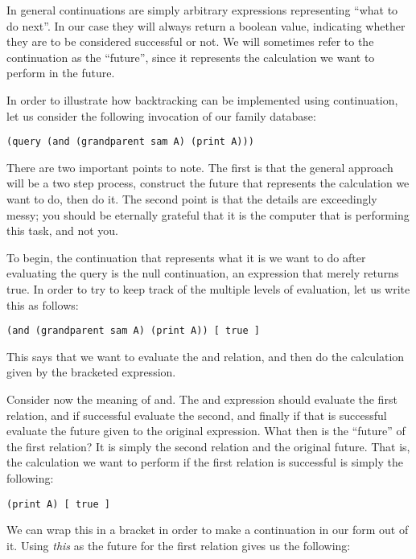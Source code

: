 In general continuations are simply arbitrary expressions representing ``what to
do next''.  In our case they will always return a boolean value, indicating
whether they are to be considered successful or not.  We will sometimes refer to
the continuation as the ``future'', since it represents the calculation we want
to perform in the future.

In order to illustrate how backtracking can be implemented using continuation,
let us consider the following invocation of our family database:

\begin{lstlisting}
(query (and (grandparent sam A) (print A)))
\end{lstlisting}

There are two important points to note.  The first is that the general approach
will be a two step process, construct the future that represents the calculation
we want to do, then do it.  The second point is that the details are exceedingly
messy; you should be eternally grateful that it is the computer that is
performing this task, and not you.

To begin, the continuation that represents what it is we want to do after
evaluating the query is the null continuation, an expression that merely returns
true.  In order to try to keep track of the multiple levels of evaluation, let
us write this as follows:

\begin{lstlisting}
(and (grandparent sam A) (print A)) [ true ]
\end{lstlisting}

This says that we want to evaluate the {\sf and} relation, and then do the
calculation given by the bracketed expression.

Consider now the meaning of {\sf and}.  The and expression should evaluate the
first relation, and if successful evaluate the second, and finally if that is
successful evaluate the future given to the original expression.  What then is
the ``future'' of the first relation?  It is simply the second relation and the
original future.  That is, the calculation we want to perform if the first
relation is successful is simply the following:

\begin{lstlisting}
(print A) [ true ]
\end{lstlisting}

We can wrap this in a bracket in order to make a continuation in our form out of
it.  Using {\em this} as the future for the first relation gives us the
following:

